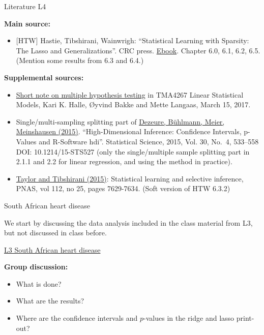 \documentclass[
  ignorenonframetext,
]{beamer}
\providecommand{\tightlist}{%
  \setlength{\itemsep}{0pt}\setlength{\parskip}{0pt}}
\begin{document}
\begin{frame}

\begin{block}{Literature L4}

\textbf{Main source:}

\begin{itemize}
\tightlist
\item
  {[}HTW{]} Hastie, Tibshirani, Wainwrigh: ``Statistical Learning with
  Sparsity: The Lasso and Generalizations''. CRC press.
  \href{https://trevorhastie.github.io/}{Ebook}. Chapter 6.0, 6.1, 6.2,
  6.5. (Mention some results from 6.3 and 6.4.)
\end{itemize}

\textbf{Supplemental sources:}

\begin{itemize}
\item
  \href{https://www.math.ntnu.no/emner/TMA4267/2017v/multtest.pdf}{Short
  note on multiple hypothesis testing} in TMA4267 Linear Statistical
  Models, Kari K. Halle, Øyvind Bakke and Mette Langaas, March 15, 2017.
\item
  Single/multi-sampling splitting part of
  \href{https://projecteuclid.org/download/pdfview_1/euclid.ss/1449670857}{Dezeure,
  Bühlmann, Meier, Meinshausen (2015)}. ``High-Dimensional Inference:
  Confidence Intervals, p-Values and R-Software hdi''. Statistical
  Science, 2015, Vol. 30, No.~4, 533--558 DOI: 10.1214/15-STS527 (only
  the single/multiple sample splitting part in 2.1.1 and 2.2 for linear
  regression, and using the method in practice).
\item
  \href{https://www.pnas.org/content/112/25/7629}{Taylor and Tibshirani
  (2015)}: Statistical learning and selective inference, PNAS, vol 112,
  no 25, pages 7629-7634. (Soft version of HTW 6.3.2)
\end{itemize}

\end{block}

\end{frame}

\begin{frame}{South African heart disease}
\protect\hypertarget{south-african-heart-disease}{}

We start by discussing the data analysis included in the class material
from L3, but not discussed in class before.

\href{http://htmlpreview.github.io/?https://github.com/mettelang/MA8701V2021/blob/main/Part1/L3.html\#Example:_South_African_heart_disease}{L3
South African heart disease}

\textbf{Group discussion:}

\begin{itemize}
\tightlist
\item
  What is done?
\item
  What are the results?
\item
  Where are the confidence intervals and \(p\)-values in the ridge and
  lasso print-out?
\end{itemize}

\end{frame}
\end{document}
